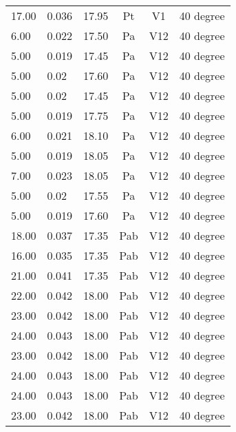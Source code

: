 \begin{table}[t]
\begin{tabular}{l | l | l | c | c | l}
17.00          & 0.036           & 17.95  & Pt       & V1     & 40 degree           \\
6.00           & 0.022           & 17.50  & Pa       & V12    & 40 degree           \\
5.00           & 0.019           & 17.45  & Pa       & V12    & 40 degree           \\
5.00           & 0.02            & 17.60  & Pa       & V12    & 40 degree           \\
5.00           & 0.02            & 17.45  & Pa       & V12    & 40 degree           \\
5.00           & 0.019           & 17.75  & Pa       & V12    & 40 degree           \\
6.00           & 0.021           & 18.10  & Pa       & V12    & 40 degree           \\
5.00           & 0.019           & 18.05  & Pa       & V12    & 40 degree           \\
7.00           & 0.023           & 18.05  & Pa       & V12    & 40 degree           \\
5.00           & 0.02            & 17.55  & Pa       & V12    & 40 degree           \\
5.00           & 0.019           & 17.60  & Pa       & V12    & 40 degree           \\
18.00          & 0.037           & 17.35  & Pab      & V12    & 40 degree           \\
16.00          & 0.035           & 17.35  & Pab      & V12    & 40 degree           \\
21.00          & 0.041           & 17.35  & Pab      & V12    & 40 degree           \\
22.00          & 0.042           & 18.00  & Pab      & V12    & 40 degree           \\
23.00          & 0.042           & 18.00  & Pab      & V12    & 40 degree           \\
24.00          & 0.043           & 18.00  & Pab      & V12    & 40 degree           \\
23.00          & 0.042           & 18.00  & Pab      & V12    & 40 degree           \\
24.00          & 0.043           & 18.00  & Pab      & V12    & 40 degree           \\
24.00          & 0.043           & 18.00  & Pab      & V12    & 40 degree           \\
23.00          & 0.042           & 18.00  & Pab      & V12    & 40 degree           \\
\end{tabular}
\end{table}


